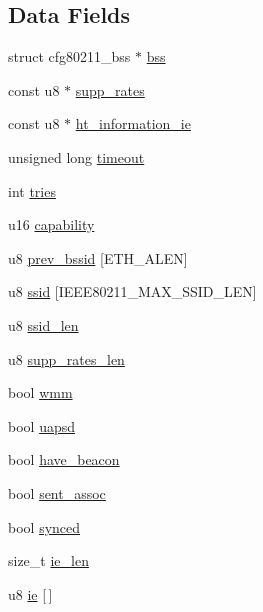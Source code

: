 \subsection*{Data Fields}
\begin{DoxyCompactItemize}
\item 
struct cfg80211\-\_\-bss $\ast$ \hyperlink{structieee80211__mgd__assoc__data_aa8d95d64d2cb5a56a0fd985733e99b06}{bss}
\item 
const u8 $\ast$ \hyperlink{structieee80211__mgd__assoc__data_a81733160347428a461c99d85fd919ca3}{supp\-\_\-rates}
\item 
const u8 $\ast$ \hyperlink{structieee80211__mgd__assoc__data_af25ab630f908a07235cef3ceaf904727}{ht\-\_\-information\-\_\-ie}
\item 
unsigned long \hyperlink{structieee80211__mgd__assoc__data_a639e65bbd749de17060d658eb233f72b}{timeout}
\item 
int \hyperlink{structieee80211__mgd__assoc__data_a04cecf6708b77deed43900afdf14e8d9}{tries}
\item 
u16 \hyperlink{structieee80211__mgd__assoc__data_ac74162c5a27aacb803f0860ac5da7d89}{capability}
\item 
u8 \hyperlink{structieee80211__mgd__assoc__data_a7855dc0e8648f9b891f31b7538bbd220}{prev\-\_\-bssid} \mbox{[}E\-T\-H\-\_\-\-A\-L\-E\-N\mbox{]}
\item 
u8 \hyperlink{structieee80211__mgd__assoc__data_ae8d768cff77168f424870b6745c90714}{ssid} \mbox{[}I\-E\-E\-E80211\-\_\-\-M\-A\-X\-\_\-\-S\-S\-I\-D\-\_\-\-L\-E\-N\mbox{]}
\item 
u8 \hyperlink{structieee80211__mgd__assoc__data_a440f44724caffefa0f9c838518a3c790}{ssid\-\_\-len}
\item 
u8 \hyperlink{structieee80211__mgd__assoc__data_a10e3f296dc2be6b8aef4938abfa6af16}{supp\-\_\-rates\-\_\-len}
\item 
bool \hyperlink{structieee80211__mgd__assoc__data_aad05de440eb553bb720ef95bd3ed964c}{wmm}
\item 
bool \hyperlink{structieee80211__mgd__assoc__data_a079aedf53e144c3df9b110cf96da2297}{uapsd}
\item 
bool \hyperlink{structieee80211__mgd__assoc__data_a9d76baa171cb69d351febe377f89a6ba}{have\-\_\-beacon}
\item 
bool \hyperlink{structieee80211__mgd__assoc__data_a03c1b4aa3a5243fe109572ed4383d718}{sent\-\_\-assoc}
\item 
bool \hyperlink{structieee80211__mgd__assoc__data_a16495d89275bc776ee62596ec8585728}{synced}
\item 
size\-\_\-t \hyperlink{structieee80211__mgd__assoc__data_a0b939c31983d2de4c3429bb789779638}{ie\-\_\-len}
\item 
u8 \hyperlink{structieee80211__mgd__assoc__data_a541e8335bc4529e686c2b6699284de24}{ie} \mbox{[}$\,$\mbox{]}
\end{DoxyCompactItemize}


